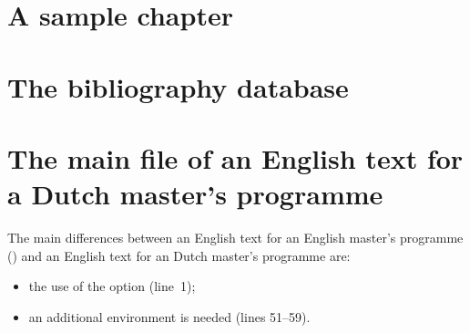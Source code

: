 \section{A sample chapter}
\label{sec:file:chap}

\section{The bibliography database}
\label{sec:file:bib}

\section{The main file of an English text for a Dutch master's programme}
\label{sec:file:hoofd}

The main differences between an English text for an English master's programme
() and an English text for an Dutch master's programme are:
\begin{itemize}
\item the use of the  option (line~1);
\item an additional  environment is needed (lines 51--59).
\end{itemize}
\medskip


